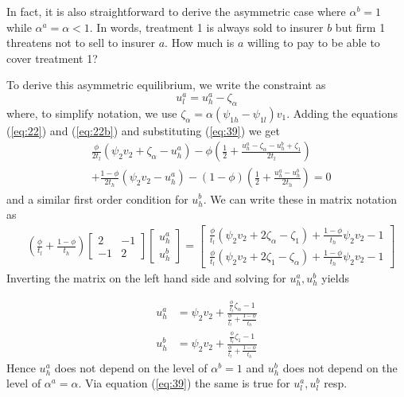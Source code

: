 \documentclass[12pt,english,a4paper]{article}
\begin{document}
In fact, it is also straightforward to derive the asymmetric case where \(\alpha^b =1\) while \(\alpha^a = \alpha <1\). In words, treatment 1 is always sold to insurer \(b\) but firm 1 threatens not to sell to insurer \(a\). How much is \(a\) willing to pay to be able to cover treatment 1?

To derive this asymmetric equilibrium, we write the constraint as
\begin{equation}
\label{eq:39}
u_l^a = u_h^a - \zeta_{\alpha}
\end{equation}
where, to simplify notation, we use \(\zeta_{\alpha}=\alpha (\psi_{1h}-\psi_{1l})v_1\).
Adding the equations (\ref{eq:22}) and (\ref{eq:22b}) and substituting (\ref{eq:39}) we get
\begin{equation}
\label{eq:40}
\begin{split}
&\frac{\phi}{2t_l}(\psi_2 v_2 + \zeta_{\alpha} - u_h^a) - \phi(\frac{1}{2} + \frac{u_h^a - \zeta_{\alpha} - u_h^b + \zeta_1}{2t_l} ) \\
&+\frac{1-\phi}{2t_h} (\psi_2 v_2 - u_h^a) - (1-\phi) (\frac{1}{2} + \frac{u_h^a - u_h^b}{2t_h} )   =0
\end{split}
\end{equation}
and a similar first order condition for \(u_h^b\). We can write these in matrix notation as
\begin{equation}
\label{eq:41}
\begin{split}
& (\frac{\phi}{t_l} + \frac{1-\phi}{t_h})
\begin{bmatrix}
2 & -1 \\
-1&  2
\end{bmatrix}
\begin{bmatrix}
u_h^a \\
u_h^b
\end{bmatrix}
=
\begin{bmatrix}
\frac{\phi}{t_l}(\psi_2 v_2 + 2 \zeta_{\alpha} - \zeta_1) + \frac{1-\phi}{t_h}\psi_2 v_2 -1 \\
\frac{\phi}{t_l}(\psi_2 v_2 + 2 \zeta_{1} - \zeta_\alpha) + \frac{1-\phi}{t_h}\psi_2 v_2 -1
\end{bmatrix}
\end{split}
\end{equation}
Inverting the matrix on the left hand side and solving for \(u_h^a,u_h^b\) yields

\begin{align}
\label{eq:47}
u_h^a &= \psi_2 v_2 + \frac{\frac{\phi}{t_l} \zeta_{\alpha} -1}{\frac{\phi}{t_l}+\frac{1-\phi}{t_h}} \\
\label{eq:47b}
u_h^b &= \psi_2 v_2 + \frac{\frac{\phi}{t_l} \zeta_{1} -1}{\frac{\phi}{t_l}+\frac{1-\phi}{t_h}}
\end{align}
Hence \(u_h^a\) does not depend on the level of \(\alpha^b =1\) and \(u_h^b\) does not depend on the level of \(\alpha^a =\alpha\). Via equation (\ref{eq:39}) the same is true for \(u_l^a,u_l^b\) resp.
\end{document}
